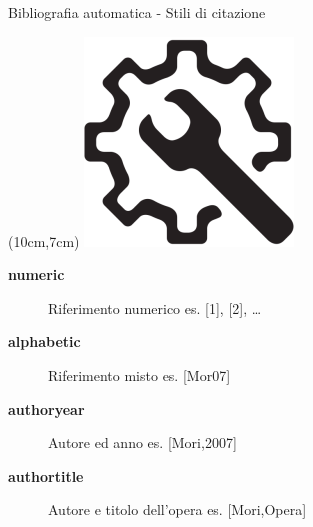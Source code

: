 \begin{frame}{Bibliografia automatica - Stili di citazione}

\begin{textblock*}{2cm}(10cm,7cm)
      \includegraphics[scale=0.28]{res/images/automatic}
\end{textblock*}

\begin{description}
	\item[\textbf{numeric}] Riferimento numerico es. [1], [2], \dots{}
	\item[\textbf{alphabetic}] Riferimento misto es. [Mor07]
	\item[\textbf{authoryear}] Autore ed anno es. [Mori,2007]
	\item[\textbf{authortitle}] Autore e titolo dell'opera es. [Mori,Opera]
\end{description}

\end{frame}